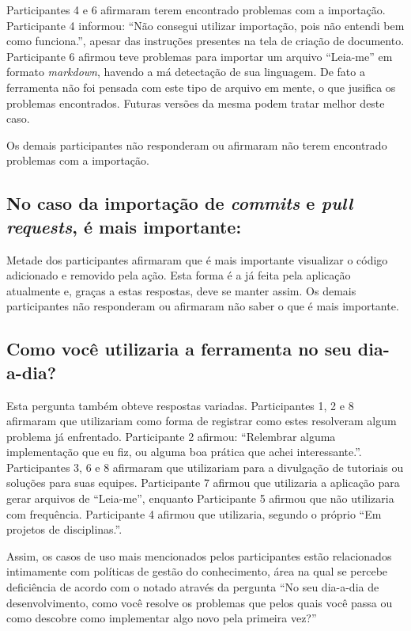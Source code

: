 Participantes 4 e 6 afirmaram terem encontrado problemas com a importação. Participante 4 informou: ``Não consegui utilizar importação, pois não entendi bem como funciona.'', apesar das instruções presentes na tela de criação de documento. Participante 6 afirmou teve problemas para importar um arquivo ``Leia-me'' em formato \textit{markdown}, havendo a má detectação de sua linguagem. De fato a ferramenta não foi pensada com este tipo de arquivo em mente, o que jusifica os problemas encontrados. Futuras versões da mesma podem tratar melhor deste caso.

Os demais participantes não responderam ou afirmaram não terem encontrado problemas com a importação.

\subsection{No caso da importação de \textit{commits} e \textit{pull requests}, é mais importante: }

Metade dos participantes afirmaram que é mais importante visualizar o código adicionado e removido pela ação. Esta forma é a já feita pela aplicação atualmente e, graças a estas respostas, deve se manter assim. Os demais participantes não responderam ou afirmaram não saber o que é mais importante.

\subsection{Como você utilizaria a ferramenta no seu dia-a-dia?}

Esta pergunta também obteve respostas variadas. Participantes 1, 2 e 8 afirmaram que utilizariam como forma de registrar como estes resolveram algum problema já enfrentado. Participante 2 afirmou: ``Relembrar alguma implementação que eu fiz, ou alguma boa prática que achei interessante.''. Participantes 3, 6 e 8 afirmaram que utilizariam para a divulgação de tutoriais ou soluções para suas equipes. Participante 7 afirmou que utilizaria a aplicação para gerar arquivos de ``Leia-me'', enquanto Participante 5 afirmou que não utilizaria com frequência. Participante 4 afirmou que utilizaria, segundo o próprio ``Em projetos de disciplinas.''.

Assim, os casos de uso mais mencionados pelos participantes estão relacionados intimamente com políticas de gestão do conhecimento, área na qual se percebe deficiência de acordo com o notado através da pergunta ``No seu dia-a-dia de desenvolvimento, como você resolve os problemas que pelos quais você passa ou como descobre como implementar algo novo pela primeira vez?''

